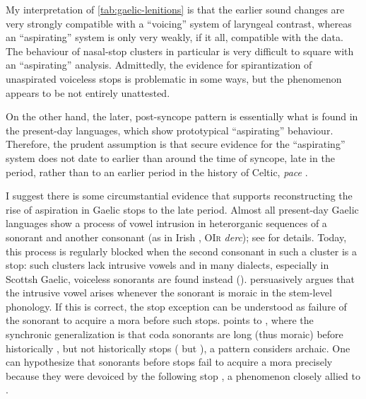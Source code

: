 \documentclass[output=paper,colorlinks,citecolor=brown]{langscibook}
\begin{document}
My interpretation of \cref{tab:gaelic-lenitions} is that the earlier sound changes are very strongly compatible with a \enquote{voicing} system of laryngeal contrast, whereas an \enquote{aspirating} system is only very weakly, if it all, compatible with the data. The behaviour of nasal\hyp stop clusters in particular is very difficult to square  with an \enquote{aspirating} analysis. Admittedly, the evidence for spirantization of unaspirated voiceless stops is problematic in some ways, but the phenomenon appears to be not entirely unattested.

On the other hand, the later, post\hyp syncope pattern is essentially what is found in the present\hyp day languages, which show prototypical \enquote{aspirating} behaviour. Therefore, the prudent assumption is that secure evidence for the \enquote{aspirating} system does not date to earlier than around the time of syncope, late in the  period, rather than to an earlier period in the history of Celtic, \textit{pace} \textcite{Eska2018}.

I suggest there is some circumstantial evidence that supports reconstructing the rise of aspiration in Gaelic  stops to the late  period. Almost all present\hyp day Gaelic languages show a process of vowel intrusion in heterorganic sequences of a sonorant and another consonant (as in Irish , \textsc{OIr} \textit{derc}); see \textcite{morrison2018metrical, epenthesis-ms} for details. Today, this process is regularly blocked when the second consonant in such a cluster is a  stop: such clusters lack intrusive vowels and in many dialects, especially in Scottsh Gaelic, voiceless sonorants are found instead (). \textcite{morrison2018metrical} persuasively argues that the intrusive vowel arises whenever the sonorant is moraic in the stem\hyp level phonology. If this is correct, the  stop exception can be understood as failure of the sonorant to acquire a mora before such stops. \Textcite{morrison2018metrical} points to  \parencite{ó1989east}, where the synchronic generalization is that coda sonorants are long (thus moraic) before historically , but not historically  stops ( but ), a pattern \textcite{morrison2018metrical} considers archaic. One can hypothesize that sonorants before  stops fail to acquire a mora precisely because they were devoiced  by the following stop \parencite[on the connection between voicing and moraicity, see][]{zec88:_sonor}, a phenomenon closely allied to . 
\end{document}
